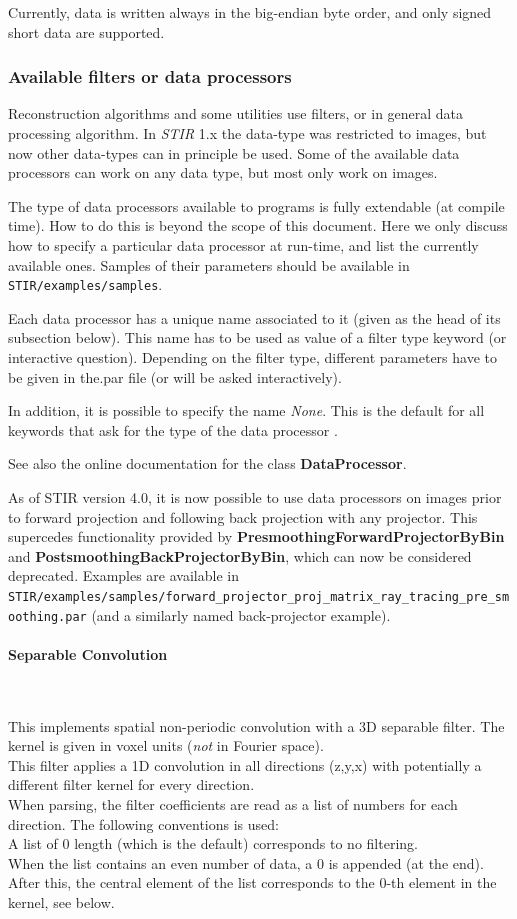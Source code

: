 \documentclass{article}
\newcommand{\tab}{\hspace{5mm}}
\newcommand{\subsubsubsection}[1]{\paragraph{#1}\mbox{} \\}
\begin{document}
{{Currently, data is written always in the big-endian byte order, 
and only signed short data are supported.



\subsubsection{
Available filters or data processors}
\label{sec:filters}
Reconstruction algorithms and some utilities use filters, or in 
general data processing algorithm. In \textit{STIR} 1.x the data-type was restricted
to images, but now other data-types can in principle be used. Some
of the available data processors can work on any data type, but most
only work on images.

The type of data processors 
available to programs is fully extendable (at compile time). 
How to do this is beyond the scope of this document. Here we 
only discuss how to specify a particular data processor at run-time, 
and list the currently available ones. Samples of their parameters 
should be available in \texttt{STIR/examples/samples}.


Each data processor has a unique name associated to it (given 
as the head of its subsection below). This name has to be used 
as value of a filter type keyword (or interactive question). 
Depending on the filter type, different parameters have to be 
given in the.par file (or will be asked interactively).


In addition, it is possible to specify the name \textit{None}. This 
is the default for all keywords that ask for the type of 
the data processor .


See also the online documentation for the class \textbf{DataProcessor}.

As of STIR version 4.0, it is now possible to use data processors 
on images prior to forward projection and following back projection
with any projector. This supercedes functionality provided by 
 \textbf{PresmoothingForwardProjectorByBin} and 
 \textbf{PostsmoothingBackProjectorByBin},
  which can now be considered deprecated. Examples are available
in \texttt{STIR/examples/samples/forward\_projector\_proj\_matrix\_ray\_tracing\_pre\_smoothing.par} 
(and a similarly named back-projector example).

{ \subsubsubsection{Separable Convolution}
}
This implements spatial non-periodic convolution with a 3D separable 
filter. The kernel is given in voxel units (\textit{not} in Fourier 
space).\\
This filter applies a 1D convolution in all directions (z,y,x) 
with potentially a different filter kernel for every direction.\\
When parsing, the filter coefficients are read as a list of numbers 
for each direction. The following conventions is used:\\
{\textbullet}\tab 
A list of 0 length (which is the default) corresponds to no filtering.\\
{\textbullet}\tab When the list contains an even number of data, a 0 is 
appended (at the end).\\
{\textbullet}\tab 
After this, the central element of the list corresponds to the 
0-th element in the kernel, see below.


}}
\end{document}
